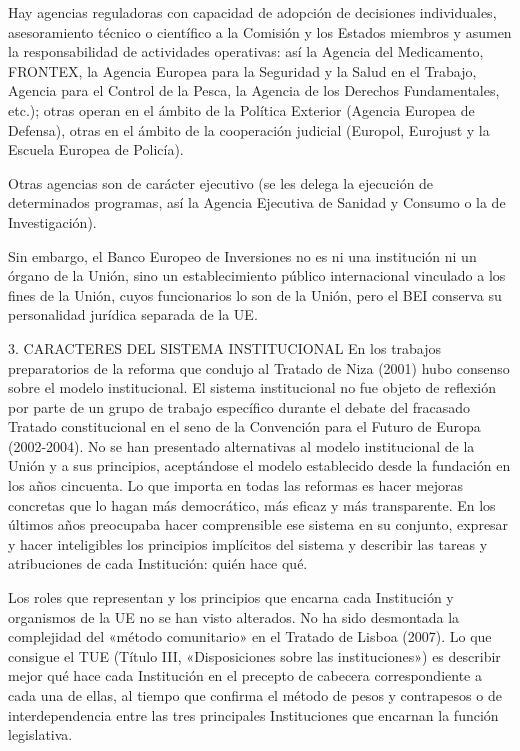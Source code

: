 \documentclass[10pt,a4paper]{article}
\begin{document}
Hay agencias reguladoras con capacidad de adopción de decisiones individuales, asesoramiento técnico o científico a la Comisión y los Estados miembros y asumen la responsabilidad de actividades operativas: así la Agencia del Medicamento, FRONTEX, la Agencia Europea para la Seguridad y la Salud en el Trabajo, Agencia para el Control de la Pesca, la Agencia de los Derechos Fundamentales, etc.); otras operan en el ámbito de la Política Exterior (Agencia Europea de Defensa), otras en el ámbito de la cooperación judicial (Europol, Eurojust y la Escuela Europea de Policía).

Otras agencias son de carácter ejecutivo (se les delega la ejecución de determinados programas, así la Agencia Ejecutiva de Sanidad y Consumo o la de Investigación).

Sin embargo, el Banco Europeo de Inversiones no es ni una institución ni un órgano de la Unión, sino un establecimiento público internacional vinculado a los fines de la Unión, cuyos funcionarios lo son de la Unión, pero el BEI conserva su personalidad jurídica separada de la UE.

3. CARACTERES DEL SISTEMA INSTITUCIONAL
En los trabajos preparatorios de la reforma que condujo al Tratado de Niza (2001) hubo consenso sobre el modelo institucional. El sistema institucional no fue objeto de reflexión por parte de un grupo de trabajo específico durante el debate del fracasado Tratado constitucional en el seno de la Convención para el Futuro de Europa (2002-2004). No se han presentado alternativas al modelo institucional de la Unión y a sus principios, aceptándose el modelo establecido desde la fundación en los años cincuenta. Lo que importa en todas las reformas es hacer mejoras concretas que lo hagan más democrático, más eficaz y más transparente. En los últimos años preocupaba hacer comprensible ese sistema en su conjunto, expresar y hacer inteligibles los principios implícitos del sistema y describir las tareas y atribuciones de cada Institución: quién hace qué.

Los roles que representan y los principios que encarna cada Institución y organismos de la UE no se han visto alterados. No ha sido desmontada la complejidad del «método comunitario» en el Tratado de Lisboa (2007). Lo que consigue el TUE (Título III, «Disposiciones sobre las instituciones») es describir mejor qué hace cada Institución en el precepto de cabecera correspondiente a cada una de ellas, al tiempo que confirma el método de pesos y contrapesos o de interdependencia entre las tres principales Instituciones que encarnan la función legislativa.
\end{document}
